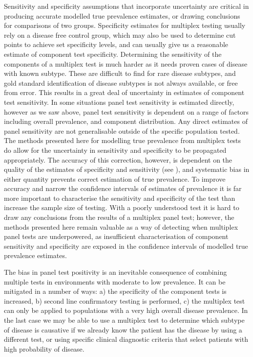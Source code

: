 \documentclass[10pt,letterpaper]{article}
\begin{document}
Sensitivity and specificity assumptions that incorporate uncertainty are critical in producing accurate modelled true prevalence estimates, or drawing conclusions for comparisons of two groups. Specificity estimates for multiplex testing usually rely on a disease free control group, which may also be used to determine cut points to achieve set specificity levels, and can usually give us a reasonable estimate of component test specificity. Determining the sensitivity of the components of a multiplex test is much harder as it needs proven cases of disease with known subtype. These are difficult to find for rare disease subtypes, and gold standard identification of disease subtypes is not always available, or free from error\cite{loeffelholz2020,leber2018}. This results in a great deal of uncertainty in estimates of component test sensitivity. In some situations panel test sensitivity is estimated directly, however as we saw above, panel test sensitivity is dependent on a range of factors including overall prevalence, and component distribution. Any direct estimates of panel sensitivity are not generalisable outside of the specific population tested. The methods presented here for modelling true prevalence from multiplex tests do allow for the uncertainty in sensitivity and specificity to be propagated appropriately. The accuracy of this correction, however, is dependent on the quality of the estimates of specificity and sensitivity (see ), and systematic bias in either quantity prevents correct estimation of true prevalence. To improve accuracy and narrow the confidence intervals of estimates of prevalence it is far more important to characterise the sensitivity and specificity of the test than increase the sample size of testing. With a poorly understood test it is hard to draw any conclusions from the results of a multiplex panel test; however, the methods presented here remain valuable as a way of detecting when multiplex panel tests are underpowered, as insufficient characterisation of component sensitivity and specificity are exposed in the confidence intervals of modelled true prevalence estimates.

The bias in panel test positivity is an inevitable consequence of combining multiple tests in environments with moderate to low prevalence. It can be mitigated in a number of ways: a) the specificity of the component tests is increased, b) second line confirmatory testing is performed, c) the multiplex test can only be applied to populations with a very high overall disease prevalence. In the last case we may be able to use a multiplex test to determine which subtype of disease is causative if we already know the patient has the disease by using a different test, or using specific clinical diagnostic criteria that select patients with high probability of disease.
\end{document}
